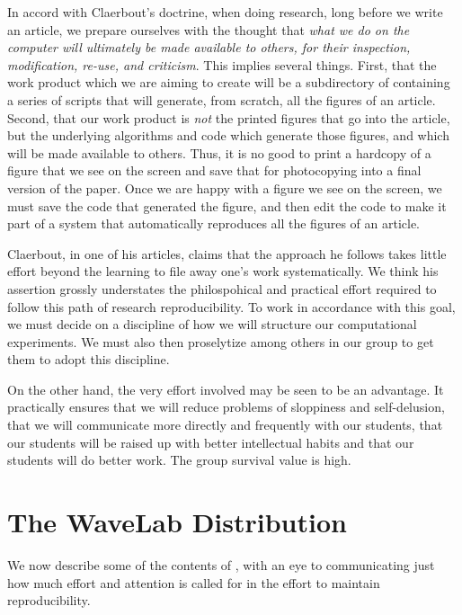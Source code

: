 In accord with Claerbout's doctrine, when doing research,
long before we write an article, we prepare ourselves
with the thought that {\it what we do on the computer
will ultimately be made available to others, for their inspection,
modification, re-use, and criticism}.   This implies
several things.  First, that the work product which we are
aiming to create will be a subdirectory of \WaveLab
containing a series of scripts that will generate,
from scratch, all the figures of an article.
Second, that our work product
is {\it not} the printed figures that go into the article,
but the underlying algorithms and code which generate
those figures, and which will be made available to others.
Thus, it is no good to print a hardcopy of a figure that we see
on the screen and save that for photocopying into
a final version of the paper.  Once we are happy with a
figure we see on the screen, we must save the code
that generated the figure, and then edit the code
to make it part of a system that automatically
reproduces all the figures of an article.

Claerbout, in one
of his articles, claims that the approach he follows
takes little effort beyond the learning to file
away one's work systematically.  We think his assertion
grossly understates
the philospohical and practical effort required
to follow this path of research reproducibility. 
To work in accordance with this goal, we must decide
on a discipline
of how we will structure our computational experiments.  We must
also then proselytize among others in our group
to get them to adopt this discipline.
 
On the other hand, the very effort involved
may be seen to be an advantage.
It practically ensures that
we will reduce problems of sloppiness and self-delusion,
that we will communicate more directly and frequently with
our students, that our students will be raised up
with better intellectual habits
and that our students will do better work.
The group survival value is high. 


\section{The WaveLab Distribution}

We now describe some of the contents of \WaveLab, with an eye
to communicating just how much effort and attention is called
for in the effort to maintain reproducibility. 

